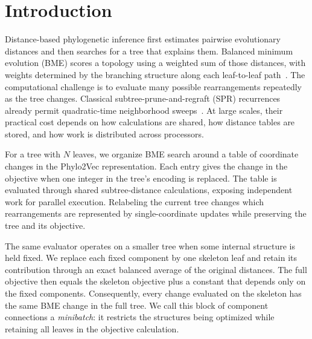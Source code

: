 \documentclass[11pt,a4paper]{article}
\makeatletter
\DeclareRobustCommand{\_}{\ifmmode\nfss@text{\textunderscore}\else\textunderscore\allowbreak\fi}
\theoremstyle{definition}
\makeatother
\begin{document}
\section{Introduction}
\label{sec:introduction}

Distance-based phylogenetic inference first estimates pairwise evolutionary distances and then searches for a tree that explains them.
Balanced minimum evolution (BME) scores a topology using a weighted sum of those distances, with weights determined by the branching structure along each leaf-to-leaf path~\cite{pauplin2000direct,desper2002fast,desper2004theory}.
The computational challenge is to evaluate many possible rearrangements repeatedly as the tree changes.
Classical subtree-prune-and-regraft (SPR) recurrences already permit quadratic-time neighborhood sweeps~\cite{hordijk2005spr,lefort2015fastme}.
At large scales, their practical cost depends on how calculations are shared, how distance tables are stored, and how work is distributed across processors.

For a tree with $N$ leaves, we organize BME search around a table of coordinate changes in the Phylo2Vec representation.
Each entry gives the change in the objective when one integer in the tree's encoding is replaced.
The table is evaluated through shared subtree-distance calculations, exposing independent work for parallel execution.
Relabeling the current tree changes which rearrangements are represented by single-coordinate updates while preserving the tree and its objective.

The same evaluator operates on a smaller tree when some internal structure is held fixed.
We replace each fixed component by one skeleton leaf and retain its contribution through an exact balanced average of the original distances.
The full objective then equals the skeleton objective plus a constant that depends only on the fixed components.
Consequently, every change evaluated on the skeleton has the same BME change in the full tree.
We call this block of component connections a \emph{minibatch}: it restricts the structures being optimized while retaining all leaves in the objective calculation.
\end{document}
